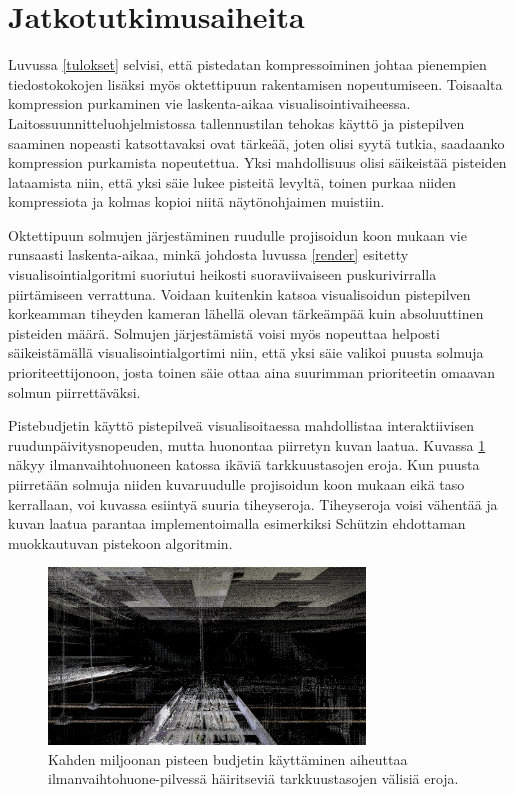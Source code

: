 \section{Jatkotutkimusaiheita}\label{jatko}

Luvussa \ref{tulokset} selvisi, että pistedatan kompressoiminen johtaa pienempien tiedostokokojen lisäksi myös oktettipuun rakentamisen nopeutumiseen. Toisaalta kompression purkaminen vie laskenta-aikaa visualisointivaiheessa. Laitossuunnitteluohjelmistossa tallennustilan tehokas käyttö ja pistepilven saaminen nopeasti katsottavaksi ovat tärkeää, joten olisi syytä tutkia, saadaanko kompression purkamista nopeutettua. Yksi mahdollisuus olisi säikeistää pisteiden lataamista niin, että yksi säie lukee pisteitä levyltä, toinen purkaa niiden kompressiota ja kolmas kopioi niitä näytönohjaimen muistiin.

Oktettipuun solmujen järjestäminen ruudulle projisoidun koon mukaan vie runsaasti laskenta-aikaa, minkä johdosta luvussa \ref{render} esitetty visualisointialgoritmi suoriutui heikosti suoraviivaiseen puskurivirralla piirtämiseen verrattuna. Voidaan kuitenkin katsoa visualisoidun pistepilven korkeamman tiheyden kameran lähellä olevan tärkeämpää kuin absoluuttinen pisteiden määrä. Solmujen järjestämistä voisi myös nopeuttaa helposti säikeistämällä visualisointialgortimi niin, että yksi säie valikoi puusta solmuja prioriteettijonoon, josta toinen säie ottaa aina suurimman prioriteetin omaavan solmun piirrettäväksi.

Pistebudjetin käyttö pistepilveä visualisoitaessa mahdollistaa interaktiivisen ruudunpäivitysnopeuden, mutta huonontaa piirretyn kuvan laatua. Kuvassa \ref{lod_border} näkyy ilmanvaihtohuoneen katossa ikäviä tarkkuustasojen eroja. Kun puusta piirretään solmuja niiden kuvaruudulle projisoidun koon mukaan eikä taso kerrallaan, voi kuvassa esiintyä suuria tiheyseroja. Tiheyseroja voisi vähentää ja kuvan laatua parantaa implementoimalla esimerkiksi Schützin \cite{potree} ehdottaman muokkautuvan pistekoon algoritmin. 

\begin{figure}
    \centering
    \includegraphics[width=0.75\textwidth]{tuloksia/ilmastointi_2M/ilmastointihuone_kaapelirata.png}
    \caption{Kahden miljoonan pisteen budjetin käyttäminen aiheuttaa ilmanvaihtohuone-pilvessä häiritseviä tarkkuustasojen välisiä eroja.}
    \label{lod_border}
\end{figure}


